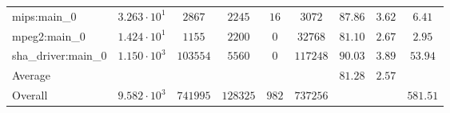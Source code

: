 \begin{tabular}{|l|c|c|c|c|c|c|c|c|}
mips:main\_0            & $ 3.263 \cdot 10^{1} $ & $ 2867   $ & $ 2245   $ & $ 16  $ & $ 3072   $ & $ 87.86       $ & $ 3.62    $ & $ 6.41    $ \\
mpeg2:main\_0           & $ 1.424 \cdot 10^{1} $ & $ 1155   $ & $ 2200   $ & $ 0   $ & $ 32768  $ & $ 81.10       $ & $ 2.67    $ & $ 2.95    $ \\
sha\_driver:main\_0     & $ 1.150 \cdot 10^{3} $ & $ 103554 $ & $ 5560   $ & $ 0   $ & $ 117248 $ & $ 90.03       $ & $ 3.89    $ & $ 53.94   $ \\
\hline
Average                 & $                    $ & $        $ & $        $ & $     $ & $        $ & $ 81.28       $ & $ 2.57    $ & $         $ \\
\hline
Overall                 & $ 9.582 \cdot 10^{3} $ & $ 741995 $ & $ 128325 $ & $ 982 $ & $ 737256 $ & $             $ & $         $ & $ 581.51  $ \\
\hline
\end{tabular}
